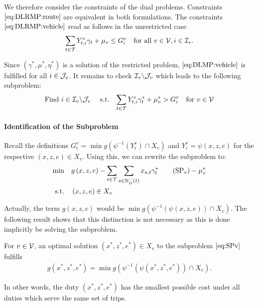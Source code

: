 We therefore consider the constraints of the dual problems. Constraints $\eqref{eq:DLRMP:route}$ are equivalent in both formulations. The constraints $\eqref{eq:DLRMP:vehicle}$ read as follows in the unrestricted case
\begin{align}
	\sum_{t\in\mathcal{T}} Y^v_{t,i}\gamma_t + \mu_v \leq G^v_i && \text{for all } v\in\mathcal{V},i\in\mathcal{I}_v. \label{eq:DLMP:vehicle}
\end{align}

Since $\left(\gamma^*,\mu^*,\eta^*\right)$ is a solution of the restricted problem, $\eqref{eq:DLMP:vehicle}$ is fulfilled for all $i\in\mathcal{J}_v$. It remains to check $\mathcal{I}_v\backslash\mathcal{J}_v$ which leads to the following subproblem:
\begin{align}
	\text{Find } i\in\mathcal{I}_v\backslash\mathcal{J}_v && \text{ s.t.} && \sum_{t\in\mathcal{T}}Y^v_{t,i}\gamma^*_t + \mu^*_v > G^v_i && \text{for } v\in\mathcal{V} \label{eq:DLMP:index}
\end{align}

\newpage

\paragraph{Identification of the Subproblem} \parfill

Recall the definitions ${G^v_i = \min g\left(\psi^{-1}\left(Y^v_i\right)\cap X_v\right)}$ and ${Y^v_i = \psi(x,z,e)}$ for the respective ${(x,z,e)\in X_v}$. Using this, we can rewrite the subproblem to:
\begin{align*}
	\min \quad & g\left(x,z,e\right)-\sum_{t\in\mathcal{T}}\sum_{s\in\Nin(t)}x_{s,t}\gamma^*_t \tag{$\operatorname{SP}_v$} - \mu^*_v \label{eq:SPv} \\
	\text{s.t.} \quad & \left(x,z,e\right)\in X_v
\end{align*}

Actually, the term $g(x,z,e)$ would be ${\min g\left(\psi^{-1}\left(\psi(x,z,e)\right)\cap X_v\right)}$. The following result shows that this distinction is not necessary as this is done implicitly be solving the subproblem.

\begin{lemma}

For $v\in\mathcal{V}$, an optimal solution ${\left(x^*,z^*,e^*\right)\in X_v}$ to the subproblem $\eqref{eq:SPv}$ fulfills
\begin{align*}
	g\left(x^*,z^*,e^*\right) = \min g\left(\psi^{-1}\left(\psi\left(x^*,z^*,e^*\right)\right)\cap X_v\right).
\end{align*}

In other words, the duty $\left(x^*,z^*,e^*\right)$ has the smallest possible cost under all duties which serve the same set of trips.

\end{lemma}

